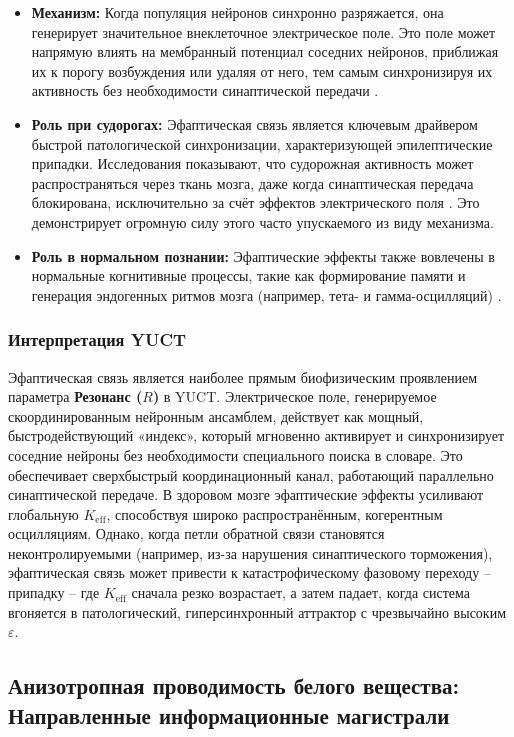 \documentclass[12pt,a4paper]{article}
\begin{document}
	\begin{itemize}
		\item \textbf{Механизм:} Когда популяция нейронов синхронно разряжается, она генерирует значительное внеклеточное электрическое поле. Это поле может напрямую влиять на мембранный потенциал соседних нейронов, приближая их к порогу возбуждения или удаляя от него, тем самым синхронизируя их активность без необходимости синаптической передачи \cite{Frohlich2010}.
		\item \textbf{Роль при судорогах:} Эфаптическая связь является ключевым драйвером быстрой патологической синхронизации, характеризующей эпилептические припадки. Исследования показывают, что судорожная активность может распространяться через ткань мозга, даже когда синаптическая передача блокирована, исключительно за счёт эффектов электрического поля \cite{Zhang2022, Dudek1998}. Это демонстрирует огромную силу этого часто упускаемого из виду механизма.
		\item \textbf{Роль в нормальном познании:} Эфаптические эффекты также вовлечены в нормальные когнитивные процессы, такие как формирование памяти и генерация эндогенных ритмов мозга (например, тета- и гамма-осцилляций) \cite{Anastassiou2011}.
	\end{itemize}
	
	\subsubsection*{Интерпретация YUCT}
	Эфаптическая связь является наиболее прямым биофизическим проявлением параметра \textbf{Резонанс (\(R\))} в YUCT. Электрическое поле, генерируемое скоординированным нейронным ансамблем, действует как мощный, быстродействующий «индекс», который мгновенно активирует и синхронизирует соседние нейроны без необходимости специального поиска в словаре. Это обеспечивает сверхбыстрый координационный канал, работающий параллельно синаптической передаче. В здоровом мозге эфаптические эффекты усиливают глобальную \(K_{\mathrm{eff}}\), способствуя широко распространённым, когерентным осцилляциям. Однако, когда петли обратной связи становятся неконтролируемыми (например, из-за нарушения синаптического торможения), эфаптическая связь может привести к катастрофическому фазовому переходу – припадку – где \(K_{\mathrm{eff}}\) сначала резко возрастает, а затем падает, когда система вгоняется в патологический, гиперсинхронный аттрактор с чрезвычайно высоким \(\varepsilon\).
	
	\subsection{Анизотропная проводимость белого вещества: Направленные информационные магистрали}
	
\end{document}
